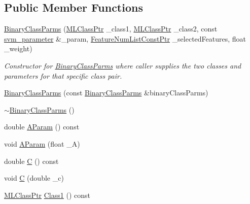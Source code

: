 \subsection*{Public Member Functions}
\begin{DoxyCompactItemize}
\item 
\hyperlink{class_k_k_m_l_l_1_1_binary_class_parms_a82f52e5b577eca48727fc4d2b27c9851}{Binary\+Class\+Parms} (\hyperlink{namespace_k_k_m_l_l_ac272393853d59e72e8456f14cd6d8c23}{M\+L\+Class\+Ptr} \+\_\+class1, \hyperlink{namespace_k_k_m_l_l_ac272393853d59e72e8456f14cd6d8c23}{M\+L\+Class\+Ptr} \+\_\+class2, const \hyperlink{class_k_k_m_l_l_1_1_binary_class_parms_ae660a06ef9477c95e89b3f1e883ca858}{svm\+\_\+parameter} \&\+\_\+param, \hyperlink{namespace_k_k_m_l_l_a81284b0a14973267260023f9a72da94a}{Feature\+Num\+List\+Const\+Ptr} \+\_\+selected\+Features, float \+\_\+weight)
\begin{DoxyCompactList}\small\item\em Constructor for \textquotesingle{}\hyperlink{class_k_k_m_l_l_1_1_binary_class_parms}{Binary\+Class\+Parms}\textquotesingle{} where caller supplies the two classes and parameters for that specific class pair. \end{DoxyCompactList}\item 
\hyperlink{class_k_k_m_l_l_1_1_binary_class_parms_a2ca8c7ab2c4d03ee3fa5fbcd5cb72353}{Binary\+Class\+Parms} (const \hyperlink{class_k_k_m_l_l_1_1_binary_class_parms}{Binary\+Class\+Parms} \&binary\+Class\+Parms)
\item 
\hyperlink{class_k_k_m_l_l_1_1_binary_class_parms_a7bf73b95bfe4be4f0e80df352b982e87}{$\sim$\+Binary\+Class\+Parms} ()
\item 
double \hyperlink{class_k_k_m_l_l_1_1_binary_class_parms_a30a735931a8328e0dc073644f42db552}{A\+Param} () const 
\item 
void \hyperlink{class_k_k_m_l_l_1_1_binary_class_parms_acefd6786f3a9dedbed281a4fc22c5fa6}{A\+Param} (float \+\_\+A)
\item 
double \hyperlink{class_k_k_m_l_l_1_1_binary_class_parms_aefb6c5d54ce92e8c8ce96f6b9f2eafc2}{C} () const 
\item 
void \hyperlink{class_k_k_m_l_l_1_1_binary_class_parms_a0ef20fda759bad3cfef0ee3994ea1b5e}{C} (double \+\_\+c)
\item 
\hyperlink{namespace_k_k_m_l_l_ac272393853d59e72e8456f14cd6d8c23}{M\+L\+Class\+Ptr} \hyperlink{class_k_k_m_l_l_1_1_binary_class_parms_aa8519ac2f7f7e4553143e12786209415}{Class1} () const 
\item 

\end{DoxyCompactItemize}

